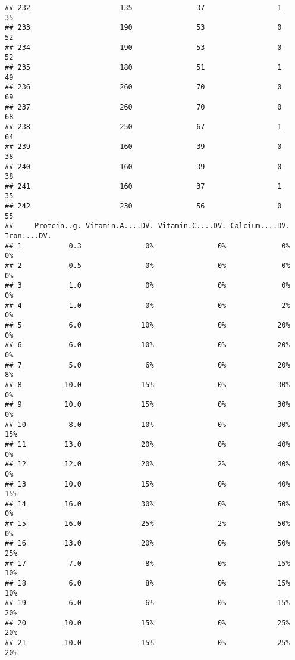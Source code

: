 \documentclass[
]{article}
\begin{document}
\begin{verbatim}
## 232                     135               37                 1         35
## 233                     190               53                 0         52
## 234                     190               53                 0         52
## 235                     180               51                 1         49
## 236                     260               70                 0         69
## 237                     260               70                 0         68
## 238                     250               67                 1         64
## 239                     160               39                 0         38
## 240                     160               39                 0         38
## 241                     160               37                 1         35
## 242                     230               56                 0         55
##     Protein..g. Vitamin.A....DV. Vitamin.C....DV. Calcium....DV. Iron....DV.
## 1           0.3               0%               0%             0%          0%
## 2           0.5               0%               0%             0%          0%
## 3           1.0               0%               0%             0%          0%
## 4           1.0               0%               0%             2%          0%
## 5           6.0              10%               0%            20%          0%
## 6           6.0              10%               0%            20%          0%
## 7           5.0               6%               0%            20%          8%
## 8          10.0              15%               0%            30%          0%
## 9          10.0              15%               0%            30%          0%
## 10          8.0              10%               0%            30%         15%
## 11         13.0              20%               0%            40%          0%
## 12         12.0              20%               2%            40%          0%
## 13         10.0              15%               0%            40%         15%
## 14         16.0              30%               0%            50%          0%
## 15         16.0              25%               2%            50%          0%
## 16         13.0              20%               0%            50%         25%
## 17          7.0               8%               0%            15%         10%
## 18          6.0               8%               0%            15%         10%
## 19          6.0               6%               0%            15%         20%
## 20         10.0              15%               0%            25%         20%
## 21         10.0              15%               0%            25%         20%

\end{verbatim}
\end{document}
